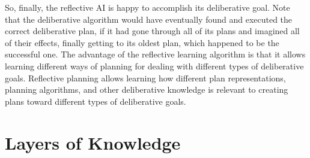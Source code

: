 So, finally, the reflective AI is happy to accomplish its deliberative
goal.  Note that the deliberative algorithm would have eventually
found and executed the correct deliberative plan, if it had gone
through all of its plans and imagined all of their effects, finally
getting to its oldest plan, which happened to be the successful one.
The advantage of the reflective learning algorithm is that it allows
learning different ways of planning for dealing with different types
of deliberative goals.  Reflective planning allows learning how
different plan representations, planning algorithms, and other
deliberative knowledge is relevant to creating plans toward different
types of deliberative goals.

\section{Layers of Knowledge}

